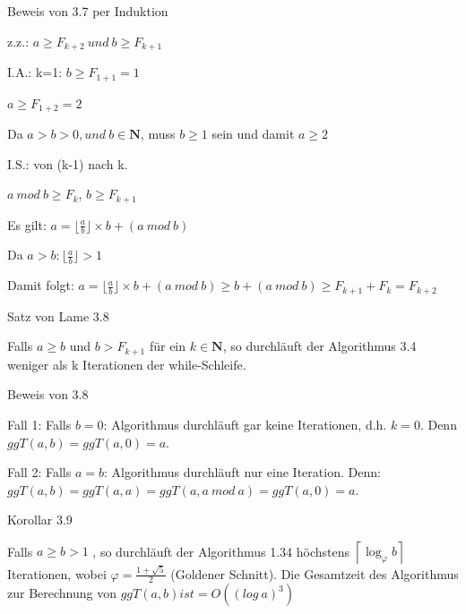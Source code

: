 \documentclass[10pt]{beamer}
\begin{document}
\begin{frame}{Beweis von 3.7 per Induktion}

z.z.: $a \geq F_{k+2} \ und \ b \geq F_{k+1}$

\vspace{0.5cm}
 I.A.: k=1: $ b \geq F_{1+1}= 1$


  \indent $a \geq F_{1+2}= 2$

\noindent  Da $a > b > 0, und  \ b \in \mathbf{N}$, muss $b \geq 1$ sein und damit $a \geq 2$


\vspace{0.4cm}
\noindent I.S.: von (k-1) nach k.
\vspace{0.15cm}

$a \ mod \ b \geq F_{k}$, $ b \geq F_{k+1}$

\vspace{0.15cm}

Es gilt: $a= \lfloor \frac{a}{b} \rfloor \times b + (a \ mod \ b)$

\vspace{0.15cm}
Da $a > b: \lfloor \frac{a}{b} \rfloor > 1$ 

\vspace{0.3cm}
\noindent Damit folgt: $a= \lfloor \frac{a}{b} \rfloor \times b + (a \ mod \ b)
\geq b+ (a \ mod  \ b) \geq F_{k+1} + F_{k}= F_{k+2}$

\end{frame}


\begin{frame}{Satz von Lame 3.8}

Falls $a \geq b$ und $b > F_{k+1}$ für ein $k \in \mathbf{N}$, so durchläuft der Algorithmus 3.4 weniger als k Iterationen der while-Schleife.

    
\end{frame}

\begin{frame}{Beweis von 3.8}

Fall 1: Falls $ b= 0$: Algorithmus durchläuft gar keine Iterationen, d.h. $k=0$. Denn $ggT(a,b)= ggT(a,0)= a$.

\vspace{0.2cm}
\noindent Fall 2: Falls $a=b$: Algorithmus durchläuft nur eine Iteration. Denn: $ggT(a,b)= ggT(a,a)= ggT(a, a \ mod \ a)= ggT(a, 0) = a$.
    
\end{frame}

\begin{frame}{Korollar 3.9}

Falls $a \geq b > 1 $ , so durchläuft der Algorithmus 1.34 höchstens $\left\lceil \log_{\varphi} b \right\rceil$ Iterationen, wobei $\varphi = \frac{1 + \sqrt{5}}{2}$  (Goldener Schnitt).
Die Gesamtzeit des Algorithmus zur Berechnung von $ggT(a,b) ist = O ((log \ a)^3)$
    
\end{frame}
\end{document}
